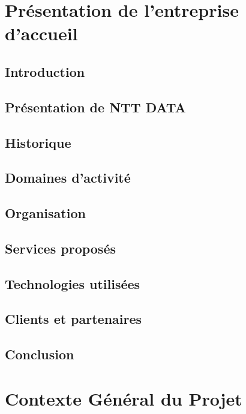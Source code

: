\documentclass[12pt,a4paper,oneside]{report}
\begin{document}
\chapter{Présentation de l'entreprise d'accueil}

\section{Introduction}

\section{Présentation de NTT DATA}

\section{Historique}

\section{Domaines d'activité}

\section{Organisation}

\section{Services proposés}

\section{Technologies utilisées}

\section{Clients et partenaires}

\section{Conclusion}


\chapter{Contexte Général du Projet}
\end{document}
